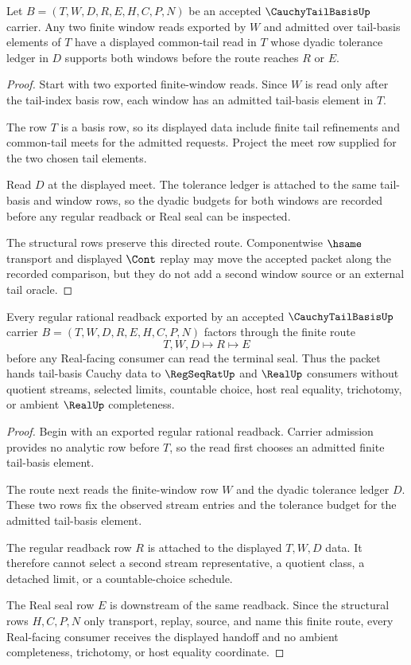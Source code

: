 \begin{theorem}
\label{thm:cauchy-tail-basis-window-directedness}
Let $B=(T,W,D,R,E,H,C,P,N)$ be an accepted $\CauchyTailBasisUp$ carrier. Any two finite window reads exported by $W$ and admitted over tail-basis elements of $T$ have a displayed common-tail read in $T$ whose dyadic tolerance ledger in $D$ supports both windows before the route reaches $R$ or $E$.
\end{theorem}
\begin{proof}
Start with two exported finite-window reads. Since $W$ is read only after the tail-index basis row, each window has an admitted tail-basis element in $T$.

The row $T$ is a basis row, so its displayed data include finite tail refinements and common-tail meets for the admitted requests. Project the meet row supplied for the two chosen tail elements.

Read $D$ at the displayed meet. The tolerance ledger is attached to the same tail-basis and window rows, so the dyadic budgets for both windows are recorded before any regular readback or Real seal can be inspected.

The structural rows preserve this directed route. Componentwise $\hsame$ transport and displayed $\Cont$ replay may move the accepted packet along the recorded comparison, but they do not add a second window source or an external tail oracle.
\end{proof}

\begin{theorem}
\label{thm:cauchy-tail-basis-regseqrat-handoff}
Every regular rational readback exported by an accepted $\CauchyTailBasisUp$ carrier $B=(T,W,D,R,E,H,C,P,N)$ factors through the finite route
$$
T,W,D \longmapsto R \longmapsto E
$$
before any Real-facing consumer can read the terminal seal. Thus the packet hands tail-basis Cauchy data to $\RegSeqRatUp$ and $\RealUp$ consumers without quotient streams, selected limits, countable choice, host real equality, trichotomy, or ambient $\RealUp$ completeness.
\end{theorem}
\begin{proof}
Begin with an exported regular rational readback. Carrier admission provides no analytic row before $T$, so the read first chooses an admitted finite tail-basis element.

The route next reads the finite-window row $W$ and the dyadic tolerance ledger $D$. These two rows fix the observed stream entries and the tolerance budget for the admitted tail-basis element.

The regular readback row $R$ is attached to the displayed $T,W,D$ data. It therefore cannot select a second stream representative, a quotient class, a detached limit, or a countable-choice schedule.

The Real seal row $E$ is downstream of the same readback. Since the structural rows $H,C,P,N$ only transport, replay, source, and name this finite route, every Real-facing consumer receives the displayed handoff and no ambient completeness, trichotomy, or host equality coordinate.
\end{proof}


